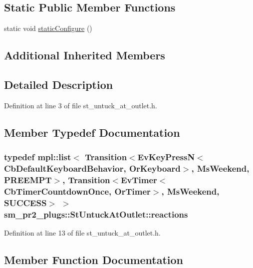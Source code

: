 \subsection*{Static Public Member Functions}
\begin{DoxyCompactItemize}
\item 
static void \hyperlink{structsm__pr2__plugs_1_1StUntuckAtOutlet_a7ec4bd71b7f8b5ce3b5229111c9afd2d}{static\+Configure} ()
\end{DoxyCompactItemize}
\subsection*{Additional Inherited Members}


\subsection{Detailed Description}


Definition at line 3 of file st\+\_\+untuck\+\_\+at\+\_\+outlet.\+h.



\subsection{Member Typedef Documentation}
\subsubsection[{\texorpdfstring{reactions}{reactions}}]{\setlength{\rightskip}{0pt plus 5cm}typedef mpl\+::list$<$ Transition$<$Ev\+Key\+PressN$<$Cb\+Default\+Keyboard\+Behavior, {\bf Or\+Keyboard}$>$, {\bf Ms\+Weekend}, {\bf P\+R\+E\+E\+M\+PT}$>$, Transition$<$Ev\+Timer$<$Cb\+Timer\+Countdown\+Once, {\bf Or\+Timer}$>$, {\bf Ms\+Weekend}, {\bf S\+U\+C\+C\+E\+SS}$>$ $>$ {\bf sm\+\_\+pr2\+\_\+plugs\+::\+St\+Untuck\+At\+Outlet\+::reactions}}\hypertarget{structsm__pr2__plugs_1_1StUntuckAtOutlet_a1453a8b43c11a6ee63d2ea2484656f12}{}\label{structsm__pr2__plugs_1_1StUntuckAtOutlet_a1453a8b43c11a6ee63d2ea2484656f12}


Definition at line 13 of file st\+\_\+untuck\+\_\+at\+\_\+outlet.\+h.



\subsection{Member Function Documentation}

